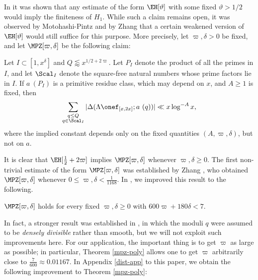 In \cite{gpy} it was shown that any estimate of the form $\EH[\vartheta]$ with some fixed $\vartheta > 1/2$ would imply the finiteness of $H_1$.  While such a claim remains open, it was observed by Motohashi-Pintz \cite{mp} and by Zhang \cite{zhang} that a certain weakened version of $\EH[\vartheta]$ would still suffice for this purpose.  More precisely, let $\varpi,\delta > 0$ be fixed, and let $\MPZ[\varpi,\delta]$ be the following claim:

\begin{claim}\label{mpz-claim} Let $I \subset
  [1,x^\delta]$ and $Q \lessapprox x^{1/2+2\varpi}$.  Let $P_I$ denote the product of all the primes in $I$, and let $\Scal_I$ denote the square-free natural numbers whose prime factors lie in $I$.  If $a\ (P_I)$ is
  a primitive residue class, which may depend on $x$, and $A \geq 1$
  is fixed, then
\begin{equation}\label{qq-mpz}
  \sum_{\substack{q \leq Q\\q \in \Scal_I}} |\Delta(\Lambda \onef_{[x,2x]}; a\ (q))| \ll x \log^{-A} x,
\end{equation}
where the implied constant depends only on the fixed quantities $(A,\varpi,\delta)$, but
not on $a$.
\end{claim}

It is clear that $\EH[\frac{1}{2}+2\varpi]$ implies $\MPZ[\varpi,\delta]$ whenever $\varpi,\delta \geq 0$.  The first non-trivial estimate of the form $\MPZ[\varpi,\delta]$ was established by Zhang \cite{zhang}, who obtained $\MPZ[\varpi,\delta]$ whenever $0 \leq \varpi, \delta < \frac{1}{1168}$.
In \cite[Theorem 2.17]{polymath8a}, we improved this result to the following.

\begin{theorem}\label{mpz-poly}  $\MPZ[\varpi,\delta]$ holds for every fixed $\varpi,\delta \geq 0$ with $600 \varpi + 180 \delta < 7$.
\end{theorem}

In fact, a stronger result was established in \cite{polymath8a}, in which the moduli $q$ were assumed to be \emph{densely divisible} rather than smooth, but we will not exploit such improvements here.  For our application, the important thing is to get $\varpi$ as large as possible; in particular, Theorem \ref{mpz-poly} allows one to get $\varpi$ arbitrarily close to $\frac{7}{600} \approx 0.01167$. In Appendix \ref{dist-app} to this paper, we obtain the following improvement to Theorem \ref{mpz-poly}:

